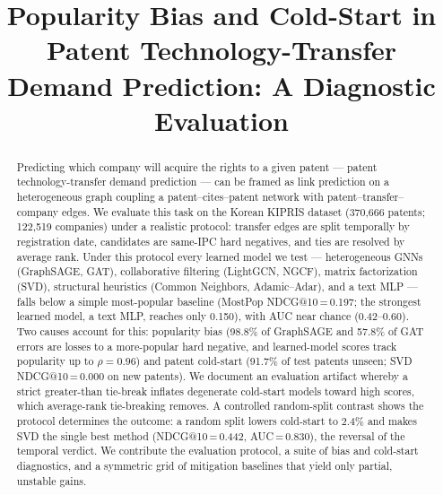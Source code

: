 \documentclass[preprint,12pt]{elsarticle}
\begin{document}
\begin{frontmatter}

\title{Popularity Bias and Cold-Start in Patent Technology-Transfer
Demand Prediction: A Diagnostic Evaluation}


\begin{abstract}
Predicting which company will acquire the rights to a given patent --- patent
technology-transfer demand prediction --- can be framed as link prediction on a
heterogeneous graph coupling a patent--cites--patent network with
patent--transfer--company edges. We evaluate this task on the Korean KIPRIS
dataset (370,666 patents; 122,519 companies) under a realistic protocol: transfer
edges are split temporally by registration date, candidates are same-IPC hard
negatives, and ties are resolved by average rank. Under this protocol every
learned model we test --- heterogeneous GNNs (GraphSAGE, GAT), collaborative
filtering (LightGCN, NGCF), matrix factorization (SVD), structural heuristics
(Common Neighbors, Adamic--Adar), and a text MLP --- falls below a simple
most-popular baseline (MostPop NDCG@10\,=\,0.197; the strongest learned model, a
text MLP, reaches only 0.150), with AUC near chance (0.42--0.60). Two causes
account for this: popularity bias (98.8\% of GraphSAGE and 57.8\% of GAT errors
are losses to a more-popular hard negative, and learned-model scores track
popularity up to $\rho=0.96$)
and patent cold-start (91.7\% of test patents unseen; SVD
NDCG@10\,=\,0.000 on new patents). We document an evaluation artifact whereby a
strict greater-than tie-break inflates degenerate cold-start models toward
high scores, which average-rank tie-breaking removes. A controlled random-split
contrast shows the protocol determines the outcome: a random split lowers cold-start to 2.4\%
and makes SVD the single best method (NDCG@10\,=\,0.442, AUC\,=\,0.830), the reversal
of the temporal verdict. We contribute the evaluation protocol, a suite of bias and cold-start
diagnostics, and a symmetric grid of mitigation baselines that yield only
partial, unstable gains.
\end{abstract}


\end{frontmatter}
\end{document}
